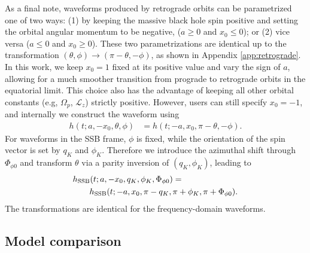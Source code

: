 \documentclass[%
 reprint,
 nofootinbib,
 amsmath,amssymb,
 aps,
 prd,
]{revtex4-2}
\begin{document}
As a final note, waveforms produced by retrograde orbits can be parametrized one of two ways: (1) by keeping the massive black hole spin positive and setting the orbital angular momentum to be negative, ($a \geq 0$ and $x_0 \leq 0$); or (2) vice versa ($a \leq 0$ and $x_0 \geq 0$). These two parametrizations are identical up to the transformation $(\theta, \phi) \rightarrow (\pi - \theta, -\phi)$, as shown in Appendix \ref{app:retrograde}. In this work, we keep $x_0 = 1$ fixed at its positive value and vary the sign of $a$, allowing for a much smoother transition from prograde to retrograde orbits in the equatorial limit. This choice also has the advantage of keeping all other orbital constants (e.g, $\Omega_p$, $\mathcal{L}_z$) strictly positive. However, users can still specify $x_0 = -1$, and internally we construct the waveform using
\begin{align}
    h(t; a, -x_0, \theta, \phi) &= h(t; -a, x_0, \pi - \theta, -\phi).
\end{align}
For waveforms in the SSB frame, $\phi$ is fixed, while the orientation of the spin vector is set by $q_K$ and $\phi_K$. Therefore we introduce the azimuthal shift through $\Phi_{\phi 0}$ and transform $\theta$ via a parity inversion of $(q_K, \phi_K)$, leading to
\begin{align}
    &h_\mathrm{SSB}(t; a, -x_0, q_K, \phi_K, \Phi_{\phi 0}) = 
    \\
    \notag 
    &\qquad h_\mathrm{SSB}(t; -a, x_0, \pi - q_K, \pi + \phi_K, \pi + \Phi_{\phi 0}).
\end{align}
The transformations are identical for the frequency-domain waveforms.

\subsection{Model comparison}
\label{sec:few}
\end{document}
